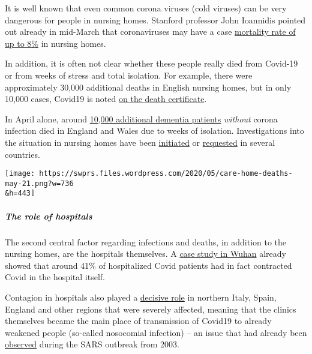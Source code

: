 It is well known that even common corona viruses (cold viruses) can be
very dangerous for people in nursing homes. Stanford professor John
Ioannidis pointed out already in mid-March that coronaviruses may have a
case
\href{https://www.statnews.com/2020/03/17/a-fiasco-in-the-making-as-the-coronavirus-pandemic-takes-hold-we-are-making-decisions-without-reliable-data/}{mortality
rate of up to 8\%} in nursing homes.

In addition, it is often not clear whether these people really died from
Covid-19 or from weeks of stress and total isolation. For example, there
were approximately 30,000 additional deaths in English nursing homes,
but in only 10,000 cases, Covid19 is noted
\href{https://www.bmj.com/content/369/bmj.m1931}{on the death
certificate}.

In April alone, around
\href{https://www.theguardian.com/world/2020/jun/05/covid-19-causing-10000-dementia-deaths-beyond-infections-research-says}{10,000
additional dementia patients} \emph{without} corona infection died in
England and Wales due to weeks of isolation. Investigations into the
situation in nursing homes have been
\href{https://www.theguardian.com/world/2020/apr/16/italian-police-broaden-care-home-coronavirus-milan}{initiated}
or
\href{https://nypost.com/2020/05/12/calls-for-independent-probe-of-gov-cuomos-nursing-home-policies/}{requested}
in several countries.

\texttt{[image: https://swprs.files.wordpress.com/2020/05/care-home-deaths-may-21.png?w=736\\\&h=443]}

\hypertarget{the-role-of-hospitals}{%
\subparagraph{\texorpdfstring{\textbf{The role of
hospitals}}{The role of hospitals}}\label{the-role-of-hospitals}}

The second central factor regarding infections and deaths, in addition
to the nursing homes, are the hospitals themselves. A
\href{https://jamanetwork.com/journals/jama/fullarticle/2761044}{case
study in Wuhan} already showed that around 41\% of hospitalized Covid
patients had in fact contracted Covid in the hospital itself.

Contagion in hospitals also played a
\href{https://medium.com/\%40tepper_jonathan/ground-zero-when-the-cure-is-worse-than-the-disease-3c513d91393d}{decisive
role} in northern Italy, Spain, England and other regions that were
severely affected, meaning that the clinics themselves became the main
place of transmission of Covid19 to already weakened people (so-called
nosocomial infection) -- an issue that had already been
\href{https://onlinelibrary.wiley.com/doi/10.1046/j.1440-1843.2003.00523.x}{observed}
during the SARS outbreak from 2003.


